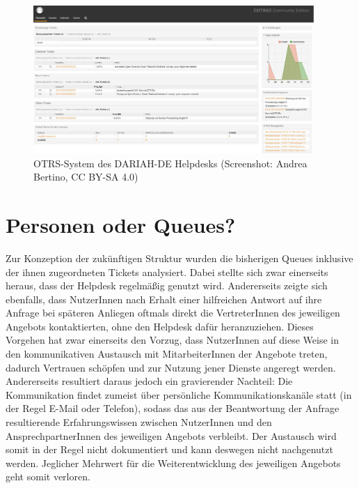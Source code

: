 \documentclass[a4paper,
fontsize=11pt,
oneside,
numbers=noperiodatend,
parskip=half-,
bibliography=totoc,
final
]{scrartcl}
\begin{document}
\begin{figure}
\centering
\includegraphics[width=0.95\textwidth]{img/OTRS.jpg}
\caption{OTRS-System des DARIAH-DE Helpdesks (Screenshot: Andrea Bertino,
CC BY-SA 4.0)}
\end{figure}

\hypertarget{personen-oder-queues}{%
\section{Personen oder Queues?}\label{personen-oder-queues}}

Zur Konzeption der zukünftigen Struktur wurden die bisherigen Queues
inklusive der ihnen zugeordneten Tickets analysiert. Dabei stellte sich
zwar einerseits heraus, dass der Helpdesk regelmäßig genutzt wird.
Andererseits zeigte sich ebenfalls, dass NutzerInnen nach Erhalt einer
hilfreichen Antwort auf ihre Anfrage bei späteren Anliegen oftmals
direkt die VertreterInnen des jeweiligen Angebots kontaktierten, ohne
den Helpdesk dafür heranzuziehen. Dieses Vorgehen hat zwar einerseits
den Vorzug, dass NutzerInnen auf diese Weise in den kommunikativen
Austausch mit MitarbeiterInnen der Angebote treten, dadurch Vertrauen
schöpfen und zur Nutzung jener Dienste angeregt werden. Andererseits
resultiert daraus jedoch ein gravierender Nachteil: Die Kommunikation
findet zumeist über persönliche Kommunikationskanäle statt (in der Regel
E-Mail oder Telefon), sodass das aus der Beantwortung der Anfrage
resultierende Erfahrungswissen zwischen NutzerInnen und den
AnsprechpartnerInnen des jeweiligen Angebots verbleibt. Der Austausch
wird somit in der Regel nicht dokumentiert und kann deswegen nicht
nachgenutzt werden. Jeglicher Mehrwert für die Weiterentwicklung des
jeweiligen Angebots geht somit verloren.
\end{document}
